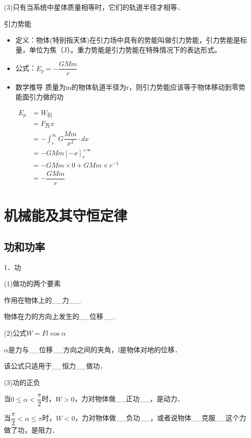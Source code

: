 \documentclass[cn,10.5pt,chinese,mac,chinesefont=founder]{elegantbook}
\begin{document}
(3)只有当系统中星体质量相等时，它们的轨道半径才相等．
\newpage
\begin{problemset}
	\item 引力势能
	\begin{itemize}
		\item 定义：物体(特别指天体)在引力场中具有的势能叫做引力势能，引力势能是标量，单位为焦（J）。重力势能是引力势能在特殊情况下的表达形式。
		\item 公式：$E_p=-\dfrac{GMm}{r}$
		\item 数学推导
		质量为m的物体轨道半径为r，则引力势能应该等于物体移动到零势能面引力做的功
		
		$\begin{aligned} 
		E_p &=W_{\text{引}} \\
		 &=F_{\text{万}}x\\
		  &=-\int_r^{\infty}G\dfrac{Mm}{x^2}· dx\\
		  &=-GMm[-x]_r^{+\infty}\\
		  &=-GMm\times 0+GMm\times r^{-1}\\
		  &=-\dfrac{GMm}{r}
		 \end{aligned}$
	\end{itemize}
\end{problemset}
\chapter{机械能及其守恒定律}

\section{功和功率}


1．功

(1)做功的两个要素

作用在物体上的\_\_力\_\_.

物体在力的方向上发生的\_\_位移\_\_.

(2)公式$W=Fl\cos \alpha$

$\alpha$是力与\_\_位移\_\_方向之间的夹角，l是物体对地的位移．

该公式只适用于\_\_恒力\_\_做功．

(3)功的正负

当$0\leq \alpha<\dfrac{\pi}{2}$时，$W>0$，力对物体做\_\_正功\_\_，是动力．

当$\dfrac{\pi}{2}<\alpha\leq π$时，$W<0$，力对物体做\_\_负功\_\_，或者说物体\_\_克服\_\_这个力做了功，是阻力．
\end{document}

